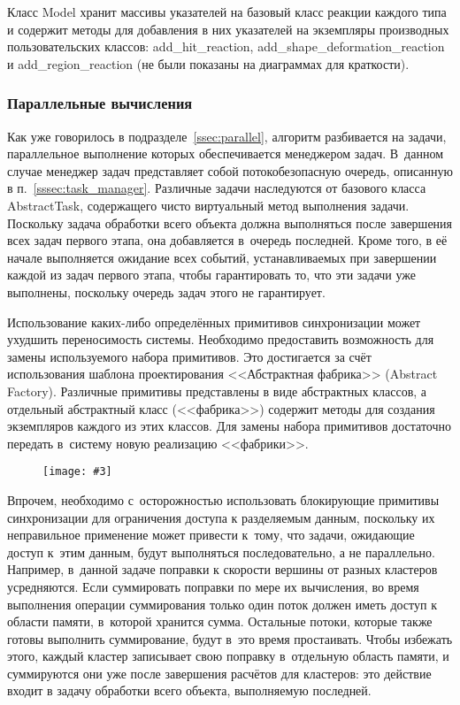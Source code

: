 \documentclass[a4paper, 14pt, titlepage]{extarticle}
\newcommand{\eng}[1]{{\English #1}}
\newenvironment{myfigure}[2]%
    {\pushQED{\caption{#1} \label{#2}} %
     \begin{figure}[!htb]\centering } %
    {  \popQED %
     \end{figure}}
\newcommand{\includefigure}[3][]{
    \begin{myfigure}{#2}{fig:#3}
      \texttt{[image: \#3]}
    \end{myfigure}
  }
\begin{document}
        Класс Model хранит массивы указателей на базовый класс реакции каждого типа и содержит
        методы для добавления в них указателей на экземпляры производных пользовательских классов:
        add\_hit\_reaction, add\_shape\_deformation\_reaction и add\_region\_reaction (не были
        показаны на диаграммах для краткости).

      \subsubsection{Параллельные вычисления}

        Как уже говорилось в подразделе~\ref{ssec:parallel}, алгоритм разбивается на задачи, параллельное
        выполнение которых обеспечивается менеджером задач. В~данном случае менеджер задач представляет собой
        потокобезопасную очередь, описанную в п.~\ref{sssec:task_manager}. Различные задачи
        наследуются от базового класса AbstractTask, содержащего чисто виртуальный метод выполнения
        задачи.  Поскольку задача обработки всего объекта должна выполняться после завершения всех
        задач первого этапа, она добавляется в~очередь последней. Кроме того, в её начале
        выполняется ожидание всех событий, устанавливаемых при завершении каждой из задач первого
        этапа, чтобы гарантировать то, что эти задачи уже выполнены, поскольку очередь задач этого не гарантирует.

        Использование каких-либо определённых примитивов синхронизации может ухудшить переносимость
        системы. Необходимо предоставить возможность для замены используемого набора примитивов.
        Это достигается за счёт использования шаблона проектирования <<Абстрактная фабрика>> (\eng{Abstract
        Factory}). Различные примитивы представлены в виде абстрактных классов, а отдельный
        абстрактный класс (<<фабрика>>) содержит методы для создания экземпляров каждого из этих
        классов. Для замены набора примитивов достаточно передать в~систему новую реализацию
        <<фабрики>>.

        \includefigure{абстрактная фабрика примитивов синхронизации.}{parallel}

        Впрочем, необходимо с~осторожностью использовать блокирующие примитивы синхронизации для
        ограничения доступа к разделяемым данным, поскольку их неправильное применение может
        привести к~тому, что задачи, ожидающие доступ к~этим данным, будут выполняться
        последовательно, а не параллельно.  Например, в~данной задаче поправки к скорости вершины от
        разных кластеров усредняются. Если суммировать поправки по мере их вычисления, во время
        выполнения операции суммирования только один поток должен иметь доступ к области памяти,
        в~которой хранится сумма. Остальные потоки, которые также готовы выполнить суммирование,
        будут в~это время простаивать. Чтобы избежать этого, каждый кластер записывает свою поправку
        в~отдельную область памяти, и суммируются они уже после завершения расчётов для кластеров:
        это действие входит в задачу обработки всего объекта, выполняемую последней.
\end{document}
